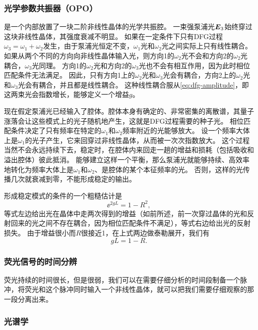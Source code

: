 \subsubsection{光学参数共振器（OPO）}\label{sec:opo}

是一个内部放置了一块二阶非线性晶体的光学共振腔。
一束强泵浦光$\vb*{E}_3$始终穿过这块非线性晶体，其强度衰减不明显。
如果在一定条件下只有DFG过程$\omega_3 = \omega_1 + \omega_2$发生，由于泵浦光恒定不变，$\omega_1$光和$\omega_2$光之间实际上只有线性耦合。
如果从两个不同的方向向非线性晶体输入光，则方向1的$\omega_2$光不会和方向2的$\omega_2$光耦合，$\omega_3$光同理。
方向1的$\omega_2$光和方向2的$\omega_3$光也不会有相互作用，因为此时相位匹配条件无法满足。
因此，只有方向1上的$\omega_2$光和$\omega_3$光会有耦合，方向2上的$\omega_2$光和$\omega_3$光会有耦合，并且都是线性耦合。
这种线性耦合服从\eqref{eq:dfg-amplitude}，即这两束光会指数增长，能够定义一个增益$g$。

现在假定泵浦光已经输入了腔体。腔体本身有确定的、非常密集的离散谱，其量子涨落会让这些模式上的光子随机地产生，这就是DFG过程需要的种子光。
相位匹配条件决定了只有频率在特定的$\omega_1$和$\omega_2$频率附近的光能够放大。
设一个频率大体上是$\omega_1$的光子产生，它来回穿过非线性晶体，从而被一次次指数放大。
这个过程当然不会永远持续下去，稳定时，在腔体内来回走一趟的增益和损耗（包括吸收和溢出腔体）彼此抵消。
能够建立这样一个平衡，那么泵浦光就能够持续、高效率地转化为频率大体上是$\omega_1$和$\omega_2$、是腔体的某个本征频率的光。
否则，这样的光传播几次就衰减到零，不能形成稳定的输出。

形成稳定模式的条件的一个粗糙估计是
\begin{equation}
    \ee^{2 g L} = 1 - R^2,
\end{equation}
等式左边给出光在晶体中走两次得到的增益（如前所述，前一次穿过晶体的光和反射回来的光之间不存在耦合，因为相位匹配条件不满足），等式右边给出光的反射损失。
由于增益很小而$R$很接近1，在上式两边做泰勒展开，我们有
\begin{equation}
    g L = 1 - R.
\end{equation}


\subsubsection{荧光信号的时间分辨}

荧光持续的时间很长，但是很弱，我们可以在需要仔细分析的时间段制备一个脉冲，将荧光和这个脉冲同时输入一个非线性晶体，就可以把我们需要仔细观察的那一段分离出来。

\subsubsection{光谱学}

